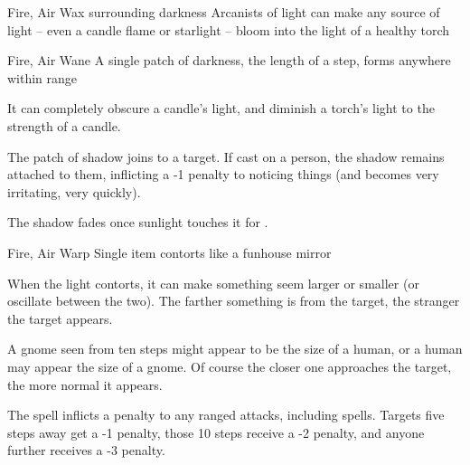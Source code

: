   {Fire, Air}%
  {Wax}%
  {}%
  {surrounding darkness}%
  {Arcanists of light can make any source of light -- even a candle flame or starlight -- bloom into the light of a healthy torch}%
  {}

  {Fire, Air}%
  {Wane}%
  {}%
  {}%
  {A single patch of darkness, the length of a step, forms anywhere within range}%
  {It can completely obscure a candle's light, and diminish a torch's light to the strength of a candle.

    The patch of shadow joins to a target.
    If cast on a person, the shadow remains attached to them, inflicting a -1 penalty to noticing things (and becomes very irritating, very quickly).

    The shadow fades once sunlight touches it for .}

  {Fire, Air}%
  {Warp}%
  {}%
  {}%
  {Single item contorts like a funhouse mirror}%
  {When the light contorts, it can make something seem larger or smaller (or oscillate between the two).
    The farther something is from the target, the stranger the target appears.

    A gnome seen from ten steps might appear to be the size of a human, or a human may appear the size of a gnome.
    Of course the closer one approaches the target, the more normal it appears.

    The spell inflicts a penalty to any ranged attacks, including spells.
    Targets five steps away get a -1 penalty, those 10 steps receive a -2 penalty, and anyone further receives a -3 penalty.}

